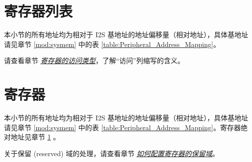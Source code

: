 \documentclass[main\_\_CN.tex]{subfiles}
\begin{document}
\hypertarget{i2s-reg-summ}{}
\section{寄存器列表}\label{sec:i2s-reg-summ}

本小节的所有地址均为相对于 I2S 基地址的地址偏移量（相对地址），具体基地址请见章节 \ref{mod:sysmem} \textit{} 中的表 \ref{table:Peripheral_Address_Mapping}。

请查看章节 \hyperref[glossary-access-types]{\textit{寄存器的访问类型}}，了解“访问”列缩写的含义。


{\clearpage}

\section{寄存器}\label{I2SRegister}

本小节的所有地址均为相对于 I2S 基地址的地址偏移量（相对地址），具体基地址请见章节 \ref{mod:sysmem} \textit{} 中的表 \ref{table:Peripheral_Address_Mapping}。寄存器绝对地址见章节 \ref{sec:i2s-reg-summ} \textit{}。

关于保留 (reserved) 域的处理，请查看章节 \hyperref[programming-reserved-field]{\textit{如何配置寄存器的保留域}}。



\end{document}
